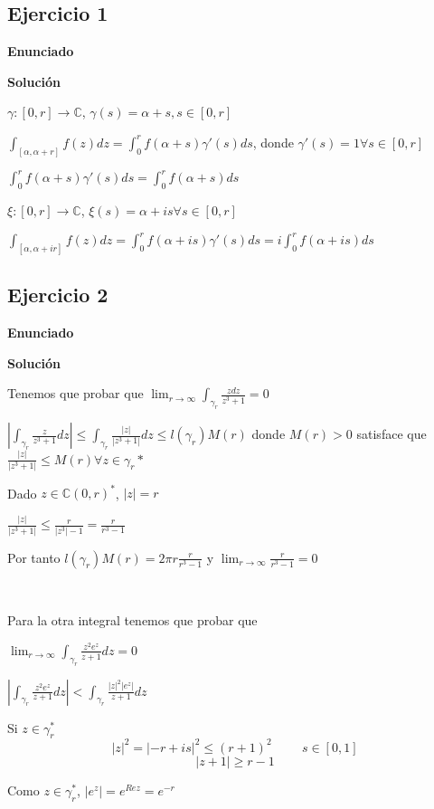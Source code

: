 \subsection{Ejercicio 1}
\textbf{Enunciado}

\textbf{Solución}

$\gamma :[0,r] \rightarrow \mathbb{C}$,
$\gamma (s) = \alpha + s, s\in[0,r]$

$\int_{[\alpha,\alpha + r]} f(z)dz = \int_{0}^{r} f(\alpha +s)\gamma ' (s)ds$, donde $\gamma ' (s) = 1 \forall s\in [0,r]$

$\int_{0}^{r} f(\alpha +s)\gamma ' (s)ds = \int_{0}^{r} f(\alpha + s)ds$

$\xi : [0,r] \rightarrow \mathbb{C}$, $\xi(s) = \alpha +is \forall s\in[0,r]$

$\int_{[\alpha,\alpha + ir]} f(z)dz = \int_0^r f(\alpha + is) \gamma ' (s)ds = i\int_0^r f(\alpha +is)ds$



\subsection{Ejercicio 2}
\textbf{Enunciado}

\textbf{Solución}
 
Tenemos que probar que
$\lim_{r\rightarrow\infty} \int_{\gamma_r} \frac{zdz}{z^3+1} = 0$

$| \int_{\gamma_r} \frac{z}{z^3+1}dz | \leq \int_{\gamma_r} \frac{|z|}{|z^3+1|} dz \leq l(\gamma_r)M(r)$
donde $M(r)>0$ satisface que $\frac{|z|}{|z^3+1|} \leq M(r) \forall z\in\gamma_r{\ast}$

Dado $z\in\mathbb{C}(0,r)^{\ast}$, $|z| = r $

$\frac{|z|}{|z^3+1|} \leq \frac{r}{|z^3|-1} = \frac{r}{r^3-1}$

Por tanto
$l(\gamma_r)M(r) = 2\pi r \frac{r}{r^3-1}$ y $\lim_{r\rightarrow\infty} \frac{r}{r^3-1} = 0$

\

Para la otra integral tenemos que probar que

$\lim_{r\rightarrow\infty} \int_{\gamma_r} \frac{z^2 e^z}{z+1} dz = 0$ 

$| \int_{\gamma_r} \frac{z^2 e^z}{z+1}dz | < \int_{\gamma_r} \frac{|z|^2 |e^z|}{z+1}dz$

Si $z\in\gamma_r^{\ast}$
$$ |z|^2 = |-r+is|^2 \leq (r+1)^2 \hspace{1cm} s\in[0,1] $$
$$ |z+1| \geq r-1 $$

Como $z\in\gamma_r^{\ast}$, $|e^z| = e^{Rez} = e^{-r}$




